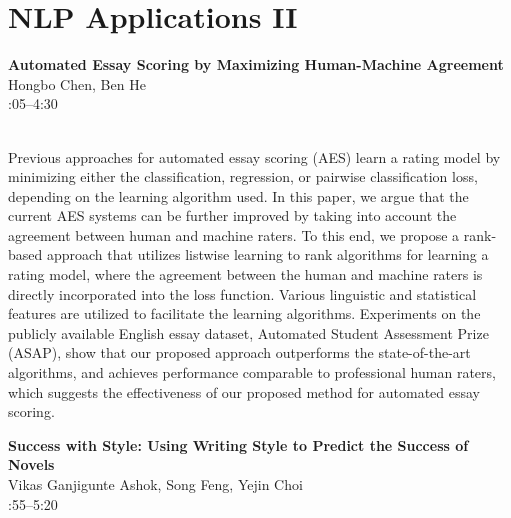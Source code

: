 \documentclass[twoside,makeidx]{book}
\renewcommand{\normalsize}{\fontsize{8}{9}\selectfont}
\renewcommand{\small}{\fontsize{7}{8}\selectfont}
\begin{document}
\section{NLP Applications II}
\vspace{-1em}
\par\vspace{2em}\noindent%
\begin{minipage}{\linewidth}%
\begin{center}
\textbf{\normalsize Automated Essay Scoring by Maximizing Human-Machine Agreement}\\
\normalsize  Hongbo Chen,  Ben He\\
{\small 4:05--4:30}\\
\end{center}
\end{minipage}\\[0.5em]
\nopagebreak%
\noindent%
{\small Previous approaches for automated essay scoring (AES) learn a rating model by minimizing either the classification, regression, or pairwise classification loss, depending on the learning algorithm used. In this paper, we argue that the current AES systems can be further improved by taking into account the agreement between human and machine raters. To this end, we propose a rank-based approach that utilizes listwise learning to rank algorithms for learning a rating model, where the agreement between the human and machine raters is directly incorporated into the loss function. Various linguistic and statistical features are utilized to facilitate the learning algorithms. Experiments on the publicly available English essay dataset, Automated Student Assessment Prize (ASAP), show that our proposed approach outperforms the state-of-the-art algorithms, and achieves performance comparable to professional human raters, which suggests the effectiveness of our proposed method for automated essay scoring.}
\par\vspace{2em}\noindent%
\begin{minipage}{\linewidth}%
\begin{center}
\textbf{\normalsize Success with Style: Using Writing Style to Predict the Success of Novels}\\
\normalsize  Vikas Ganjigunte Ashok,  Song Feng,  Yejin Choi\\
{\small 4:55--5:20}\\
\end{center}
\end{minipage}\\[0.5em]
\end{document}
